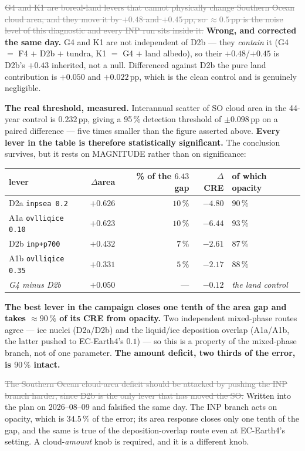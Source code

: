 \documentclass[10pt]{article}
\newcommand{\dead}[1]{\textcolor{gray}{\sout{#1}}}
\begin{document}
\dead{G4 and K1 are boreal-land levers that cannot physically change Southern Ocean cloud
area, and they move it by $+0.48$ and $+0.45$\,pp, so ${\approx}0.5$\,pp is the noise level
of this diagnostic and every INP run sits inside it.} \textbf{Wrong, and corrected the same
day.} G4 and K1 are not independent of D2b --- they \emph{contain} it (G4 $=$ F4 $+$ D2b $+$
tundra, K1 $=$ G4 $+$ land albedo), so their $+0.48$/$+0.45$ is D2b's $+0.43$ inherited, not
a null. Differenced against D2b the pure land contribution is $+0.050$ and $+0.022$\,pp,
which is the clean control and is genuinely negligible.

\textbf{The real threshold, measured.} Interannual scatter of SO cloud area in the 44-year
control is $0.232$\,pp, giving a 95\,\% detection threshold of $\pm0.098$\,pp on a paired
difference --- five times smaller than the figure asserted above. \textbf{Every lever in the
table is therefore statistically significant.} The conclusion survives, but it rests on
MAGNITUDE rather than on significance:

\begin{center}\footnotesize
\begin{tabular}{l r r r l}
\toprule
lever & $\Delta$area & \% of the $6.43$ gap & $\Delta$CRE & of which opacity \\
\midrule
D2a \texttt{inpsea 0.2} & $+0.626$ & $10\,\%$ & $-4.80$ & $90\,\%$ \\
A1a \texttt{ovlliqice 0.10} & $+0.623$ & $10\,\%$ & $-6.44$ & $93\,\%$ \\
D2b \texttt{inp+p700} & $+0.432$ & $7\,\%$ & $-2.61$ & $87\,\%$ \\
A1b \texttt{ovlliqice 0.35} & $+0.331$ & $5\,\%$ & $-2.17$ & $88\,\%$ \\
\midrule
\emph{G4 minus D2b} & $+0.050$ & --- & $-0.12$ & \emph{the land control} \\
\bottomrule
\end{tabular}
\end{center}

\noindent \textbf{The best lever in the campaign closes one tenth of the area gap and takes
${\approx}90\,\%$ of its CRE from opacity.} Two independent mixed-phase routes agree ---
ice nuclei (D2a/D2b) and the liquid/ice deposition overlap (A1a/A1b, the latter pushed to
EC-Earth4's $0.1$) --- so this is a property of the mixed-phase branch, not of one
parameter. \textbf{The amount deficit, two thirds of the error, is $90\,\%$ intact.}

\dead{The Southern Ocean cloud-area deficit should be attacked by pushing the INP branch
harder, since D2b is the only lever that has moved the SO.} Written into the plan on
2026--08--09 and falsified the same day. The INP branch acts on opacity, which is $34.5\,\%$
of the error; its area response closes only one tenth of the gap, and the same is true of
the deposition-overlap route even at EC-Earth4's setting. A cloud-\emph{amount} knob is
required, and it is a different knob.
\end{document}
